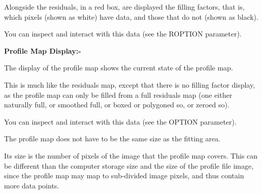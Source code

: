 \begin{small}
{{  Alongside the residuals, in a red box, are displayed the
  filling factors, that is, which pixels (shown as white) have data,
  and those that do not (shown as black).
 
  You can inspect and interact with this data (see the ROPTION parameter).
 
{\bf \hspace*{2em} Profile Map Display:-}
 
  The display of the profile map shows the current state of the
  profile map.
 
  This is much like the residuals map, except that there is no filling
  factor display, as the profile map can only be filled from a full
  residuals map (one either naturally full, or smoothed full, or boxed
  or polygoned so, or zeroed so).
 
  You can inspect and interact with this data (see the OPTION parameter).
 
  The profile map does not have to be the same size as the fitting
  area.
 
  Its size is the number of pixels of the image that the profile map
  covers. This can be different than the computer storage size and the
  size of the profile file image, since the profile map may map to
  sub-divided image pixels, and thus contain more data points.
 
}}
\end{small}
